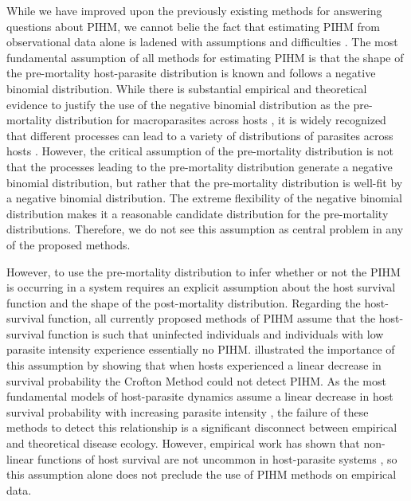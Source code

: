\documentclass[12pt, a4paper]{article}
\begin{document}
While we have improved upon the previously existing methods for answering questions
about PIHM, we cannot belie the fact that estimating PIHM from observational
data alone is ladened with assumptions and difficulties \citep{McCallum2000a}.
The most fundamental assumption of all methods for estimating PIHM is that the
shape of the pre-mortality host-parasite distribution is known and follows a negative binomial distribution.
While there is substantial empirical and theoretical evidence to justify the
use of the negative binomial distribution as the pre-mortality distribution for
macroparasites across hosts \citep{Calabrese2011,Anderson1982a,Shaw1998}, it is
widely recognized that different processes can lead to a variety of
distributions of parasites across hosts \citep{Isham1995,Grenfell1995b,Wilson2002, Duerr2003}.  However, the
critical assumption of the pre-mortality distribution is not that the processes
leading to the pre-mortality distribution generate a negative binomial
distribution, but rather that the pre-mortality distribution is well-fit by a
negative binomial distribution. The extreme flexibility of the negative binomial
distribution makes it a reasonable candidate distribution for the pre-mortality
distributions.  Therefore, we do not see this assumption as central problem in
any of the proposed methods.

However, to use the pre-mortality distribution to infer whether or not the PIHM
is occurring in a system requires an explicit assumption about the host
survival function and the shape of the post-mortality distribution.  Regarding
the host-survival function, all currently proposed methods of PIHM assume that
the host-survival function is such that uninfected individuals and individuals
with low parasite intensity experience essentially no PIHM.
\cite{Lanciani1989} illustrated the importance of this assumption by showing
that when hosts experienced a linear decrease in survival probability the
Crofton Method could not detect PIHM.   As the most fundamental models of host-parasite dynamics assume a linear decrease in host survival probability with
increasing parasite intensity \citep{AndersonandMay1978}, the failure of these methods
to detect this relationship is a significant disconnect between empirical and
theoretical disease ecology.  However, empirical work has shown that non-linear
functions of host survival are not uncommon in host-parasite systems
\citep{Benesh2011}, so this assumption alone does not preclude the use of PIHM
methods on empirical data.
\end{document}
